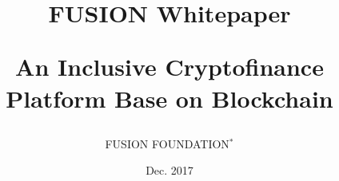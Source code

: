 \documentclass[a4paper,12pt]{article}
\begin{document}
\title{FUSION Whitepaper \\[2ex] \begin{large} An Inclusive Cryptofinance Platform Base on Blockchain\end{large}
}
\author{FUSION FOUNDATION$^*$}

\date{Dec. 2017}
\renewcommand{\thefootnote}{\fnsymbol{footnote}}
\singlespacing
\vspace{-.2in}
\renewcommand\abstractname{\large{Executive Summary\footnotetext{*FUSION FOUNDATION LTD. is a non-government organization
  based in Singapore. E-mail: info@fusion.org.
  }}}
\end{document}
